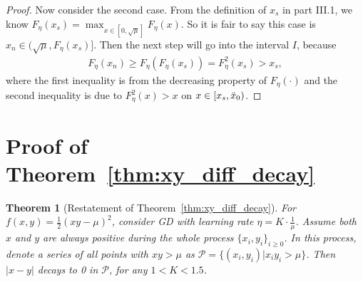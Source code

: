 \documentclass{article}
\theoremstyle{plain}
\newtheorem{theorem}{Theorem}
\theoremstyle{remark}
\newcommand{\red}[1]{{\color{black}#1}}
\begin{document}
\begin{proof}
Now consider the second case. From the definition of $x_s$ in part III.1,  we know $F_\eta(x_s)=\max_{x\in [0,\sqrt{\mu}]} F_\eta(x)$. So it is fair to say this case is $x_n\in(\sqrt{\mu}, F_\eta(x_s)]$. Then the next step will go into the interval $I$, because
\begin{align*}
    F_\eta(x_n)\ge F_\eta(F_\eta(x_s))=F^2_\eta(x_s)>x_s,
\end{align*}
where the first inequality is from the decreasing property of $F_\eta(\cdot)$ and the second inequality is due to $F^2_\eta(x)>x$ on $x\in[x_s,\Bar{x}_0)$.
\end{proof}%

\section{Proof of Theorem~\ref{thm:xy_diff_decay}}
\label{app:xy_diff_decay}

\begin{theorem}[Restatement of Theorem~\ref{thm:xy_diff_decay}]
For $f(x,y)=\frac{1}{2}\left(xy-\mu\right)^2$, consider GD with learning rate $\eta=K\cdot\frac{1}{\mu}$. Assume both $x$ and $y$ are always positive during the whole process $\{x_i,y_i\}_{i\ge 0}$. In this process, denote a series of all points with $xy>\mu$ as $\mathcal{P}=\{(x_i,y_i)|x_i y_i>\mu\}$. Then $|x-y|$ \red{decays to 0} in $\mathcal{P}$, for any $1<K<1.5$.
\end{theorem}
\end{document}
